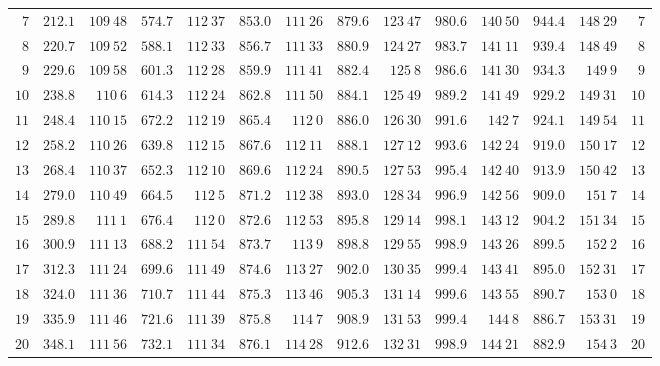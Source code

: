 \begin{GaussVICeresFrame}{.92}
{\begin{tabular}{r@{\GaussVICeresRule}r|r@{\GaussVICeresRule}r|r@{\GaussVICeresRule}r|r@{\GaussVICeresRule}r|r@{\GaussVICeresRule}r|r@{\GaussVICeresRule}r|r@{\GaussVICeresRule}r}
$7$ & $212.1$ & $109\ 48$ & $574.7$ & $112\ 37$ & $853.0$ & $111\ 26$ & $879.6$ & $123\ 47$ & $980.6$ & $140\ 50$ & $944.4$ & $148\ 29$ & $7$ \\
$8$ & $220.7$ & $109\ 52$ & $588.1$ & $112\ 33$ & $856.7$ & $111\ 33$ & $880.9$ & $124\ 27$ & $983.7$ & $141\ 11$ & $939.4$ & $148\ 49$ & $8$ \\
$9$ & $229.6$ & $109\ 58$ & $601.3$ & $112\ 28$ & $859.9$ & $111\ 41$ & $882.4$ & $125\ 8$ & $986.6$ & $141\ 30$ & $934.3$ & $149\ 9$ & $9$ \\
$10$ & $238.8$ & $110\ 6$ & $614.3$ & $112\ 24$ & $862.8$ & $111\ 50$ & $884.1$ & $125\ 49$ & $989.2$ & $141\ 49$ & $929.2$ & $149\ 31$ & $10$ \\[3pt]
$11$ & $248.4$ & $110\ 15$ & $672.2$ & $112\ 19$ & $865.4$ & $112\ 0$ & $886.0$ & $126\ 30$ & $991.6$ & $142\ 7$ & $924.1$ & $149\ 54$ & $11$ \\
$12$ & $258.2$ & $110\ 26$ & $639.8$ & $112\ 15$ & $867.6$ & $112\ 11$ & $888.1$ & $127\ 12$ & $993.6$ & $142\ 24$ & $919.0$ & $150\ 17$ & $12$ \\
$13$ & $268.4$ & $110\ 37$ & $652.3$ & $112\ 10$ & $869.6$ & $112\ 24$ & $890.5$ & $127\ 53$ & $995.4$ & $142\ 40$ & $913.9$ & $150\ 42$ & $13$ \\
$14$ & $279.0$ & $110\ 49$ & $664.5$ & $112\ 5$ & $871.2$ & $112\ 38$ & $893.0$ & $128\ 34$ & $996.9$ & $142\ 56$ & $909.0$ & $151\ 7$ & $14$ \\
$15$ & $289.8$ & $111\ 1$ & $676.4$ & $112\ 0$ & $872.6$ & $112\ 53$ & $895.8$ & $129\ 14$ & $998.1$ & $143\ 12$ & $904.2$ & $151\ 34$ & $15$ \\[3pt]
$16$ & $300.9$ & $111\ 13$ & $688.2$ & $111\ 54$ & $873.7$ & $113\ 9$ & $898.8$ & $129\ 55$ & $998.9$ & $143\ 26$ & $899.5$ & $152\ 2$ & $16$ \\
$17$ & $312.3$ & $111\ 24$ & $699.6$ & $111\ 49$ & $874.6$ & $113\ 27$ & $902.0$ & $130\ 35$ & $999.4$ & $143\ 41$ & $895.0$ & $152\ 31$ & $17$ \\
$18$ & $324.0$ & $111\ 36$ & $710.7$ & $111\ 44$ & $875.3$ & $113\ 46$ & $905.3$ & $131\ 14$ & $999.6$ & $143\ 55$ & $890.7$ & $153\ 0$ & $18$ \\
$19$ & $335.9$ & $111\ 46$ & $721.6$ & $111\ 39$ & $875.8$ & $114\ 7$ & $908.9$ & $131\ 53$ & $999.4$ & $144\ 8$ & $886.7$ & $153\ 31$ & $19$ \\
$20$ & $348.1$ & $111\ 56$ & $732.1$ & $111\ 34$ & $876.1$ & $114\ 28$ & $912.6$ & $132\ 31$ & $998.9$ & $144\ 21$ & $882.9$ & $154\ 3$ & $20$ \\[3pt]

\end{tabular}}
\end{GaussVICeresFrame}
